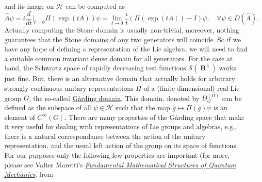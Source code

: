 \documentclass[a4paper]{article}
\DeclareMathOperator{\R}{\mathbf{R}}
\begin{document}
    and its image on $\mathcal{H}$ can be computed as
    \begin{equation}
        \hat{A}\psi
        =
        i \frac{d}{dt}\bigg|_{t=0} 
        \Pi(\exp(tA)) \psi
        = 
        \lim_{t \to 0} \frac{i}{t}(\Pi(\exp(tA)) - I)\psi,
        \quad
        \forall \psi \in D(\hat{A}).
    \end{equation}
    Actually computing the Stone domain is usually
    non-trivial, moreover, nothing guarantees that the Stone
    domains of any two generators will coincide. So if we
    have any hope of defining a representation of the Lie
    algebra, we will need to find a suitable common
    invariant dense domain for all generators. For the case
    at hand, the Schwartz space of rapidly decreasing test
    functions $\mathscr{S}(\R^3)$ works just fine. But,
    there is an alternative domain that actually holds for
    arbitrary strongly-continuous unitary representations
    $\Pi$ of a (finite dimensional) real Lie group $G$, the
    so-called
    \href{https://en.wikipedia.org/wiki/G%C3%A5rding_domain}{Gårding
    domain}.
    This domain, denoted by $D_G^{(\Pi)}$ can be defined as
    the subspace of all $\psi \in \mathcal{H}$ such that the
    map $g \mapsto \Pi(g) \psi$ is an element of
    $C^{\infty}(G)$. There are many properties of the
    Gårding space that make it very useful for dealing with
    representations of Lie groups and algebras, e.g., there
    is a natural correspondance between the action of the
    unitary representation, and the usual left action of the
    group on its space of functions. For our
    purposes only the following few properties are important
    (for more, please see Valter Moretti's
    \textit{\href{https://link.springer.com/book/10.1007/978-3-030-18346-2}{Fundamental
    Mathematical Structures of Quantum Mechanics}}, from
\end{document}
